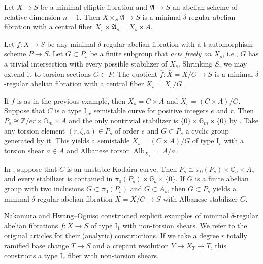 \documentclass[reqno, letterpaper]{amsart}
\numberwithin{equation}{subsection}
\let\to\longrightarrow
\newcommand{\GG}{\mathbb{G}}
\newcommand{\ZZ}{\mathbb{Z}}
\DeclareMathOperator{\Alb}{Alb}
\begin{document}
	\begin{example}
		Let $X \to S$ be a minimal elliptic fibration and $\mathfrak A \to S$ an abelian scheme of relative dimension $n-1$. Then $X \times_S \mathfrak A \to S$ is a minimal $\delta$-regular abelian fibration with a central fiber $X_s \times \mathfrak A_s = X_s \times A$.
	\end{example}
	
	\begin{example}  \label{ex:semistable with torsion shear}
		Let $f : X \to S$ be any minimal $\delta$-regular abelian fibration with a t-automorphism scheme $P \to S$. Let $G \subset P_s$ be a finite subgroup that \emph{acts freely on $X_s$}, i.e., $G$ has a trivial intersection with every possible stabilizer of $X_s$. Shrinking $S$, we may extend it to torsion sections $G \subset P$. The quotient $\bar f : \bar X = X/G \to S$ is a minimal $\delta$-regular abelian fibration with a central fiber $\bar X_s = X_s / G$.
		
		If $f$ is as in the previous example, then $X_s = C \times A$ and $\bar X_s = (C \times A)/G$. Suppose that $C$ is a type $\mathrm I_{er}$ semistable curve for positive integers $e$ and $r$. Then $P_s \cong \ZZ/er \times \GG_m \times A$ and the only nontrivial stabilizer is $\{ 0 \} \times \GG_m \times \{ 0 \}$ by . Take any torsion element $(r,\zeta,a) \in P_s$ of order $e$ and $G \subset P_s$ a cyclic group generated by it. This yields a semistable $\bar X_s = (C \times A) / G$ of type $\mathrm I_r$ with a torsion shear $a \in A$ and Albanese torsor $\Alb_{\bar X_s} = A/a$.
	\end{example}
	
	\begin{example} 
		In , suppose that $C$ is an unstable Kodaira curve. Then $P_s \cong \pi_0(P_s) \times \GG_a \times A_s$ and every stabilizer is contained in $\pi_0(P_s) \times \GG_a \times \{ 0 \}$. If $G$ is a finite abelian group with two inclusions $G \subset \pi_0(P_s)$ and $G \subset A_s$, then $G \subset P_s$ yields a minimal $\delta$-regular abelian fibration $\bar X = X / G \to S$ with Albanese stabilizer $G$.
	\end{example}
	
	\begin{example} 
		Nakamura \cite{nak77} and Hwang--Oguiso \cite{hwang-ogu16} constructed explicit examples of minimal $\delta$-regular abelian fibrations $f : X \to S$ of type $\mathrm I_1$ with non-torsion shears. We refer to the original articles for their (analytic) constructions. If we take a degree $r$ totally ramified base change $T \to S$ and a crepant resolution $Y \to X_T \to T$, this constructs a type $\mathrm I_r$ fiber with non-torsion shears.
	\end{example}
	
\end{document}
